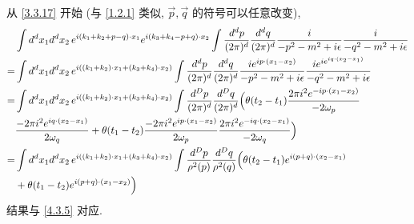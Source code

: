 \begin{itemize}
	\begin{tcolorbox}[title=calculation:]
		从 \eqref{3.3.17} 开始 (与 \eqref{1.2.1} 类似, $\vec{p}, \vec{q}$ 的符号可以任意改变),
		\begin{align}
			& \int d^d x_1 d^d x_2 \, e^{i (k_1 + k_2 + p - q) \cdot x_1} e^{i (k_3 + k_4 - p + q) \cdot x_2} \int \frac{d^d p}{(2 \pi)^d} \frac{d^d q}{(2 \pi)^d} \frac{i}{- p^2 - m^2 + i \epsilon} \frac{i}{- q^2 - m^2 + i \epsilon} \notag \\
			=& \int d^d x_1 d^d x_2 \, e^{i ((k_1 + k_2) \cdot x_1 + (k_3 + k_4) \cdot x_2)} \int \frac{d^d p}{(2 \pi)^d} \frac{d^d q}{(2 \pi)^d} \frac{i e^{i p \cdot (x_1 - x_2)}}{- p^2 - m^2 + i \epsilon} \frac{i e^{i e^{i q \cdot (x_2 - x_1)}}}{- q^2 - m^2 + i \epsilon} \notag \\
			=& \int d^d x_1 d^d x_2 \, e^{i ((k_1 + k_2) \cdot x_1 + (k_3 + k_4) \cdot x_2)} \int \frac{d^D p}{(2 \pi)^d} \frac{d^D q}{(2 \pi)^d} \Big( \theta(t_2 - t_1) \frac{2 \pi i^2 e^{- i p \cdot (x_1 - x_2)}}{- 2 \omega_p} \notag \\
			& \frac{- 2 \pi i^2 e^{i q \cdot (x_2 - x_1)}}{2 \omega_q} + \theta(t_1 - t_2) \frac{- 2 \pi i^2 e^{i p \cdot (x_1 - x_2)}}{2 \omega_p} \frac{2 \pi i^2 e^{- i q \cdot (x_2 - x_1)}}{- 2 \omega_q} \Big) \notag \\
			=& \int d^d x_1 d^d x_2 \, e^{i ((k_1 + k_2) \cdot x_1 + (k_3 + k_4) \cdot x_2)} \int \frac{d^D p}{\rho^2(p)} \frac{d^D q}{\rho^2(q)} \Big( \theta(t_2 - t_1) e^{i (p + q) \cdot (x_2 - x_1)} \notag \\
			& + \theta(t_1 - t_2) e^{i (p + q) \cdot (x_1 - x_2)} \Big)
		\end{align}
		结果与 \eqref{4.3.5} 对应.
	\end{tcolorbox}
\end{itemize}

